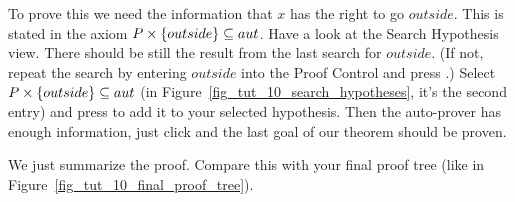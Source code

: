To prove this we need the information that $x$ has the right to go $outside$.
This is stated in the axiom $P \mathbin\times\{outside\}\subseteq aut$.
Have a look at the \textsf{Search Hypothesis} view. There should be still the result from the last search for $outside$.
(If not, repeat the search by entering $outside$ into the \textsf{Proof Control} and press .)
Select $P \mathbin\times\{outside\}\subseteq aut$ (in Figure~\ref{fig_tut_10_search_hypotheses}, it's the second entry) and
  press  to add it to your selected hypothesis.
Then the auto-prover has enough information, just click  and
  the last goal of our theorem should be proven.

We just summarize the proof. Compare this with your final proof tree (like in 
Figure~\ref{fig_tut_10_final_proof_tree}).

